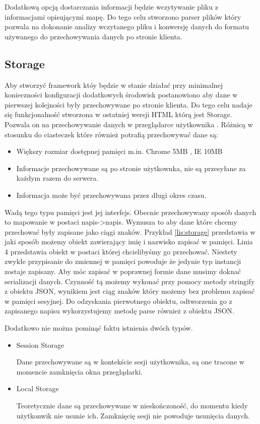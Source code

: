 Dodatkową opcją dostarczania informacji będzie wczytywanie pliku z informacjami opisującymi mapę. Do tego celu stworzono parser plików który pozwala na dokonanie analizy wczytanego pliku i konwersję danych do formatu używanego do przechowywania danych po stronie klienta.

\subsection{Storage}
\label{subsec:storage5}
Aby stworzyć framework któy będzie w stanie działać przy minimalnej konieczności konfiguracji dodatkowych środowisk postanowiono aby dane w pierwszej kolejności były przechowywane po stronie klienta. Do tego celu nadaje się funkcjonalność stworzona w ostatniej wersji HTML którą jest Storage. Pozwala on na przechowywanie danych w przeglądarce użytkownika \cite{html5dive}. Różnicą w stosunku do ciasteczek które również potrafią przechowywać dane są:
\begin{itemize}
\item
Większy rozmiar dostępnej pamięci m.in. Chrome 5MB \nocite{chrome5mb}, IE 10MB
\item
Informacje przechowywane są po stronie użytkownka, nie są przesyłane za każdym razem do serwera.
\item
Informacja może być przechowywana przez długi okres czasu.
\end{itemize}

Wadą tego typu pamięci jest jej interfejs. Obecnie przechowywany sposób danych to mapowanie w postaci napis->napis. Wymusza to aby dane które chcemy przechować były zapisane jako ciągi znaków. Przykład \ref{lis:storage} przedstawia w jaki sposób możemy obiekt zawierający imię i nazwisko zapisać w pamięci. Linia 4 przedstawia obiekt w postaci której chcielibyśmy go przechować. Niestety zwykłe przypisanie do zmiennej w pamięci powoduje że jedynie typ instancji zostaje zapisany. Aby móc zapisać w poprawnej formie dane musimy doknać serializacji danych. Czynność tą możemy wykonać przy pomocy metody stringify z obiektu JSON, wynikiem jest ciąg znaków który możemy bez problemu zapisać w pamięci sesyjnej. Do odzyskania pierwotnego obiektu, odtworzenia go z zapisanego napisu wykorzystujemy metodę parse również z obiektu JSON.

Dodatkowo nie można pominąć faktu istnienia dwóch typów.
\begin{itemize}

\item
Session Storage 

Dane przechowywane są w kontekście sesji użytkownika, są one tracone w momencie zamknięcia okna przeglądarki.

\item
Local Storage 

Teoretycznie dane są przechowywane w nieskończoność, do momentu kiedy użytkonwik nie usunie ich. Zamknięcię sesji nie powoduje usunięcia danych.

\end{itemize}

